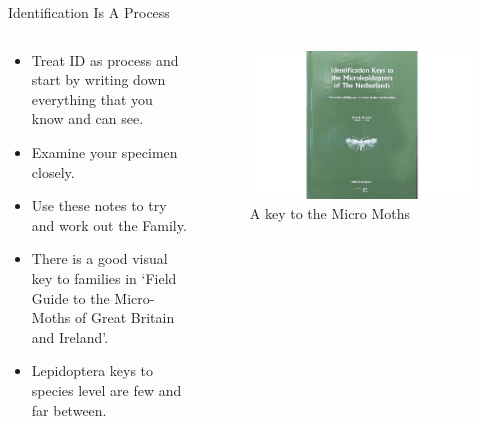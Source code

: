 \documentclass[
  ignorenonframetext,
]{beamer}
\providecommand{\tightlist}{%
  \setlength{\itemsep}{0pt}\setlength{\parskip}{0pt}}
\begin{document}
\begin{frame}{Identification Is A Process}
\protect\hypertarget{identification-is-a-process}{}
\begin{columns}[T]
\begin{column}{0.5\textwidth}
\begin{itemize}
\tightlist
\item
  Treat ID as process and start by writing down everything that you know
  and can see.
\item
  Examine your specimen closely.
\item
  Use these notes to try and work out the Family.
\item
  There is a good visual key to families in `Field Guide to the
  Micro-Moths of Great Britain and Ireland'.
\item
  Lepidoptera keys to species level are few and far between.
\end{itemize}
\end{column}

\begin{column}{0.5\textwidth}
\begin{figure}
\centering
\includegraphics{./images/micro-lep-key.jpg}
\caption{A key to the Micro Moths}
\end{figure}
\end{column}
\end{columns}
\end{frame}
\end{document}

